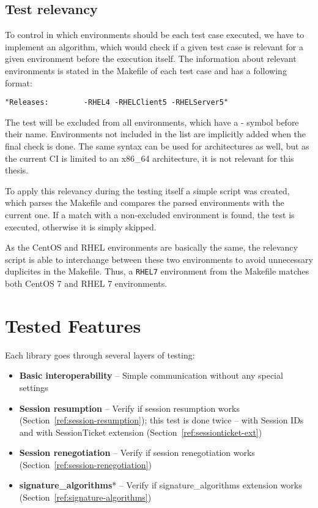 \subsection{Test relevancy} \label{ref:test-relevancy}
    To control in which environments should be each test case executed, we have
    to implement an algorithm, which would check if a given test case is relevant
    for a given environment before the execution itself. The information about
    relevant environments is stated in the Makefile of each test case and has
    a following format:

    \begin{lstlisting}
"Releases:        -RHEL4 -RHELClient5 -RHELServer5"
    \end{lstlisting}

    The test will be excluded from all environments, which have a - symbol
    before their name. Environments not included in the list are implicitly
    added when the final check is done. The same syntax can be used for
    architectures as well, but as the current CI is limited to an x86\_64
    architecture, it is not relevant for this thesis.

    To apply this relevancy during the testing itself a simple script was
    created, which parses the Makefile and compares the parsed environments
    with the current one. If a match with a non-excluded environment is found,
    the test is executed, otherwise it is simply skipped.

    As the CentOS and RHEL environments are basically the same, the relevancy
    script is able to interchange between these two environments to avoid
    unnecessary duplicites in the Makefile. Thus, a \texttt{RHEL7} environment
    from the Makefile matches both CentOS 7 and RHEL 7 environments.

\section{Tested Features}
    Each library goes through several layers of testing:

    \begin{itemize}
        \item \textbf{Basic interoperability} -- Simple communication without
            any special settings
        \item \textbf{Session resumption} -- Verify if session resumption works
            (Section~\ref{ref:session-resumption}); this test is done twice --
            with Session IDs and with SessionTicket
            extension (Section~\ref{ref:sessionticket-ext})
        \item \textbf{Session renegotiation} -- Verify if session renegotiation
            works (Section~\ref{ref:session-renegotiation})
        \item \textbf{signature\_algorithms}* -- Verify if signature\_algorithms
            extension works (Section~\ref{ref:signature-algorithms})
    \end{itemize}

